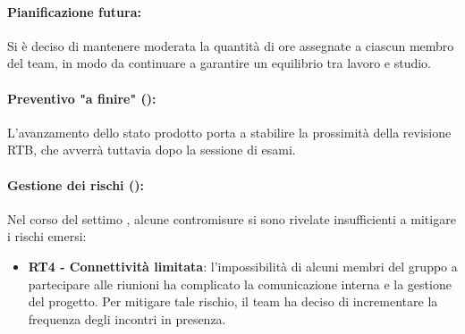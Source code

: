 \paragraph*{Pianificazione futura:}
\par Si è deciso di mantenere moderata la quantità di ore assegnate a ciascun membro del team, in modo da continuare a garantire un equilibrio tra lavoro e studio.

\paragraph*{Preventivo "a finire" ():}
\par L'avanzamento dello stato prodotto porta a stabilire la prossimità della revisione RTB, che avverrà tuttavia dopo la sessione di esami.

\paragraph*{Gestione dei rischi ():}
\par Nel corso del settimo , alcune contromisure si sono rivelate insufficienti a mitigare i rischi emersi:
\begin{itemize}
  \item \textbf{RT4 - Connettività limitata}: l'impossibilità di alcuni membri del gruppo a partecipare alle riunioni ha complicato la comunicazione interna e la gestione del progetto. Per mitigare tale rischio, il team ha deciso di incrementare la frequenza degli incontri in presenza.
\end{itemize}

